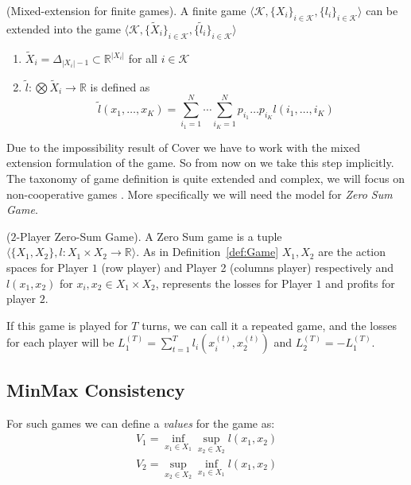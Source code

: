 \begin{definition}(Mixed-extension for finite games).
A finite game $\langle\mathcal K,\{X_i\}_{i\in\mathcal K},\{l_i\}_{i\in\mathcal K}\rangle$ can be extended into the game $\langle\mathcal K,\{\tilde X_i\}_{i\in\mathcal K},\{\tilde l_i\}_{i\in\mathcal K}\rangle$
\begin{enumerate}
	\item $\tilde X_i=\Delta_{|X_i|-1}\subset \mathbb R^{|X_i|}$ for all $i\in\mathcal K$ 
	\item $\tilde l:\bigotimes \tilde X_i\to\mathbb R$ is defined as
	$$\tilde l(x_1,\ldots,x_K)=\sum\limits_{i_1=1}^N\cdots\sum\limits_{i_K=1}^Np_{i_1}\ldots p_{i_K}l(i_1,\ldots,i_K)$$ 
\end{enumerate}
\end{definition}

Due to the impossibility result of Cover  we have to work with the mixed extension formulation of the game. So from now on we take this step implicitly.
The taxonomy of game definition is quite extended and complex, we will focus on non-cooperative games . More specifically we will need the model for \emph{Zero Sum Game}. 

\begin{definition}($2$-Player Zero-Sum Game).\label{def:ZSG}
A Zero Sum game is a tuple $\langle\{X_1,X_2\},l:X_1\times X_2\to\mathbb R\rangle$. As in Definition~\ref{def:Game} $X_1,X_2$ are the action spaces for Player $1$ (row player) and Player 2 (columns player) respectively and $l(x_1,x_2)$ for $x_i,x_2\in X_1\times X_2$, represents the losses for Player $1$ and profits for player $2$.
\end{definition}

If this game is played for $T$ turns, we can call it a repeated game, and the losses for each player will be $L_1^{(T)}=\sum\limits_{t=1}^Tl_i\left(x_i^{(t)},x_2^{(t)}\right)$ and $L_2^{(T)}=-L_1^{(T)}$. 


\subsection{MinMax Consistency}
For such games we can define a \emph{values} for the game as: 
\begin{align}
    V_1=\inf\limits_{x_1\in X_1}\sup\limits_{x_2\in X_2}l(x_1,x_2)\\
	V_2=\sup\limits_{x_2\in X_2}\inf\limits_{x_1\in X_1}l(x_1,x_2)
\end{align}

